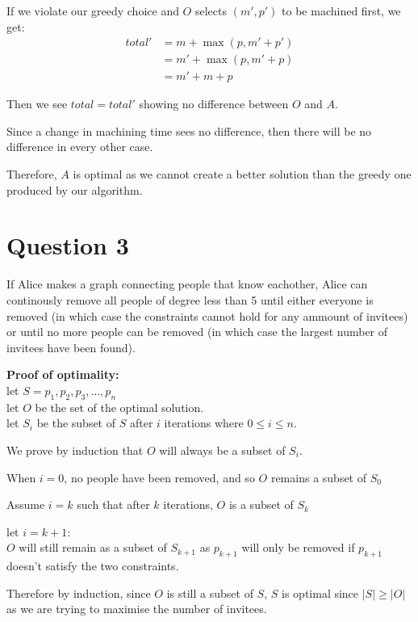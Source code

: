 \documentclass{article}
\begin{document}
If we violate our greedy choice and $O$ selects $(m', p')$ to be machined first, we get:
\begin{align*}
    total' &= m + \max(p, m' + p')\\
           &= m' + \max(p, m' + p)\\
           &= m' + m + p
\end{align*}

Then we see $total = total'$ showing no difference between $O$ and $A$.

Since a change in machining time sees no difference, then there will be no difference in every other case.

Therefore, $A$ is optimal as we cannot create a better solution than the greedy one produced by our algorithm.

\section*{Question 3}
If Alice makes a graph connecting people that know eachother, Alice can continously remove all people of degree less than 5 until either everyone is removed (in which case the constraints cannot hold for any ammount of invitees) or until no more people can be removed (in which case the largest number of invitees have been found).

\textbf{Proof of optimality:}\\
let $S = {p_1, p_2, p_3, \ldots, p_n}$\\
let $O$ be the set of the optimal solution.\\
let $S_i$ be the subset of $S$ after $i$ iterations where $0 \leq i \leq n$.

We prove by induction that $O$ will always be a subset of $S_i$.

When $i = 0$, no people have been removed, and so $O$ remains a subset of $S_0$

Assume $i = k$ such that after $k$ iterations, $O$ is a subset of $S_k$

let $i = k + 1$:\\
$O$ will still remain as a subset of $S_{k+1}$ as $p_{k+1}$ will only be removed if $p_{k+1}$ doesn't satisfy the two constraints.

Therefore by induction, since $O$ is still a subset of $S$, $S$ is optimal since $|S| \geq |O|$ as we are trying to maximise the number of invitees.
\end{document}
